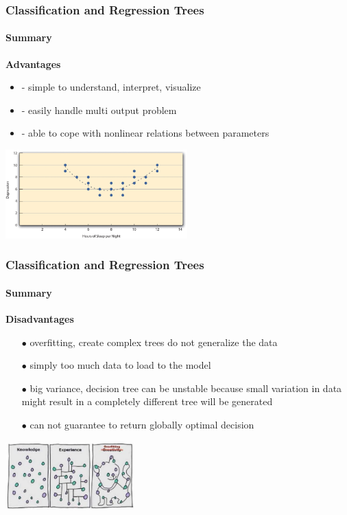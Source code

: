 \begin{frame}
	\frametitle{Classification and Regression Trees}
		\framesubtitle{Summary}

		
		\textbf{Advantages}
		\begin{center}
		\begin{itemize}
		  \item - simple to understand, interpret, visualize
		  \item - easily handle multi output problem
		  \item - able to cope with nonlinear relations between parameters
		\end{itemize}
		
		\vfill
		
		\includegraphics[width=7cm]{./figures/pros}
		\end{center}
		
\end{frame}

\begin{frame}
	\frametitle{Classification and Regression Trees}
		\framesubtitle{Summary}

		
		\textbf{Disadvantages}
		\begin{center}
		\begin{itemize}
		   \item[$\bullet$] overfitting, create complex trees do not generalize the data
		   \item[$\bullet$] simply too much data to load to the model 
		   \item[$\bullet$] big variance, decision tree can be unstable because small variation in data might result  in a completely different tree will be generated
		   \item[$\bullet$] can not guarantee to return globally optimal decision
		\end{itemize}
		
		\vfill
		
		\includegraphics[width=5cm]{./figures/cons}
		\end{center}
		
\end{frame}

